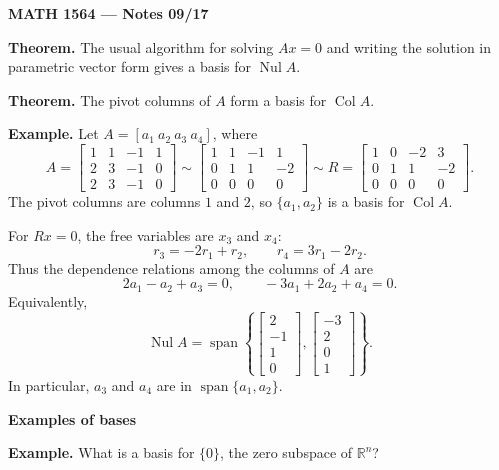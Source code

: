 \documentclass{article}
\begin{document}
\textbf{MATH 1564 --- Notes 09/17}

\bigskip

\textbf{Theorem.} The usual algorithm for solving $Ax=0$ and writing the solution in parametric vector form gives a basis for $\operatorname{Nul} A$.

\medskip

\textbf{Theorem.} The pivot columns of $A$ form a basis for $\operatorname{Col} A$.

\medskip

\textbf{Example.} Let $A=[a_1\ a_2\ a_3\ a_4]$, where
\[
A=
\begin{bmatrix}
1&1&-1&1\\
2&3&-1&0\\
2&3&-1&0
\end{bmatrix}
\sim
\begin{bmatrix}
1&1&-1&1\\
0&1&1&-2\\
0&0&0&0
\end{bmatrix}
\sim
R=
\begin{bmatrix}
1&0&-2&3\\
0&1&1&-2\\
0&0&0&0
\end{bmatrix}.
\]
The pivot columns are columns $1$ and $2$, so $\{a_1,a_2\}$ is a basis for $\operatorname{Col} A$.

\medskip

For $Rx=0$, the free variables are $x_3$ and $x_4$:
\[
r_3=-2r_1+r_2,\qquad r_4=3r_1-2r_2.
\]
Thus the dependence relations among the columns of $A$ are
\[
2a_1-a_2+a_3=0,
\qquad
-3a_1+2a_2+a_4=0.
\]
Equivalently,
\[
\operatorname{Nul} A=\operatorname{span}\left\{
\begin{bmatrix}2\\-1\\1\\0\end{bmatrix},
\begin{bmatrix}-3\\2\\0\\1\end{bmatrix}
\right\}.
\]
In particular, $a_3$ and $a_4$ are in $\operatorname{span}\{a_1,a_2\}$.

\newpage

\textbf{Examples of bases}

\medskip

\textbf{Example.} What is a basis for $\{0\}$, the zero subspace of $\mathbb{R}^n$?
\end{document}

